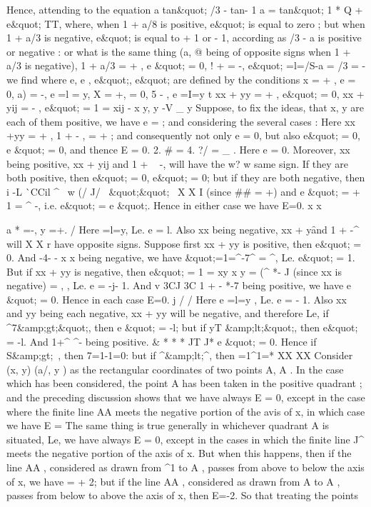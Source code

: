 \documentclass[11pt,a4paper]{book}
\begin{document}
{{%

Hence, attending
to the equation
a
tan\&quot;
/3 - tan-
1 a =
tan\&quot;
1 *
Q +
e\&quot; TT,
where,
when
1 + a/8
is
positive,
e\&quot;
is
equal
to
zero
;
but
when
1 + a/3
is
negative,
e\&quot;
is
equal
to + 1
or - 1, according
as
/3 - a
is
positive
or
negative
:
or what
is the
same thing
(a, @ being of opposite signs when
1 + a/3
is negative),
1 + a/3 = +
,
e
\&quot; = 0,
! +
= -,
e\&quot; =l=/S-a = /3 = -
we
find
where
e,
e
,
e\&quot;,
e\&quot; are
defined by the conditions
x
= +
,
e
= 0,
a)
= -,
e =l = y,
X
= +,
= 0,
5 -
,
e =I=y
t
xx + yy = +
,
e\&quot; = 0,
xx + yij = -
,
e\&quot; =
1 = xij - x y,
y -V _
y
Suppose,
to
fix
the
ideas,
that
x,
y
are
each
of
them
positive, we
have
e =
;
and considering the
several cases
:
Here
xx +yy = +
,
1 + -
, = +
;
and
consequently
not
only
e = 0,
but
also
e\&quot; = 0,
e
\&quot; = 0, and thence E = 0.
2.
\# = 4.
?/ = _
.
Here
e = 0.
Moreover,
xx
being
positive,
xx + yij
and
1 + ~
-,
will
have
the
w? w
same
sign.
If
they
are
both
positive,
then
e\&quot; = 0,
e\&quot; = 0;
but
if
they
are
both
negative, then
i
-L ^^ CCil
^~ w
(/ ^^
/
~\&quot;\&quot;~
X
X
I
(since \#\# = +) and
e
\&quot; = + 1 = ^
-,
i.e.
e\&quot; = e
\&quot;.
Hence
in
either case we have E=0.
x
x


a
* =-, y =+.
/
Here
=l=y,
Le.
e = l.
Also xx
being
negative,
xx + y\f and
1 + -^
will
X X
r
have
opposite
signs.
Suppose
first
xx + yy
is
positive,
then
e\&quot; = 0.
And
-4- -
x x
being
negative, we have
\&quot;=1=^-7^ = ^, Le.
e\&quot; =
1.
But
if xx + yy
is negative,
then
e\&quot; =
1 = xy
x y =
(^
*-
J
(since xx
is
negative) =
,
,
Le.
e =
-j- 1.
And
\*v
3CJ
3C
1 + -
*-7 being positive, we have
e
\&quot; = 0.
Hence
in each
case E=0.
j
/
/
Here
e =l=y
,
Le.
e = - 1.
Also xx
and
yy
being
each
negative, xx + yy
will be negative, and therefore
Le,
if
^7\&amp;gt;\&quot;, then
e
\&quot; = -l;
but
if yT
\&amp;lt;\&quot;, then
e\&quot; = -l.
And 1+^
^- being positive.
\&
*
*
*
JT
J*
e
\&quot; = 0.
Hence
if
S\&amp;gt;~, then
7=1-1=0:
but
if
^\&amp;lt;^, then
=1^1=*
XX
XX
Consider
(x,
y)
(a/, y
)
as
the
rectangular
coordinates
of
two
points A, A
.
In
the
case
which
has
been
considered,
the
point A
has
been
taken
in
the
positive
quadrant
;
and
the
preceding
discussion
shows
that
we
have always E = 0,
except
in
the
case
where
the
finite
line AA
meets
the
negative
portion
of
the
avis
of
x,
in
which
case we
have E =
The same thing
is true generally in whichever quadrant
A
is
situated, Le,
we
have
always E = 0, except
in
the cases
in which
the
finite
line
J^
meets
the
negative
portion
of
the
axis
of
x.
But
when
this
happens,
then
if
the
line AA
,
considered
as
drawn
from
^1
to A
,
passes
from
above
to
below
the
axis
of
x, we
have
= + 2;
but
if the
line AA
, considered as drawn
from A
to A ,
passes
from
below
to
above the
axis
of
x, then E=-2.
So
that
treating
the points

}}
\end{document}
